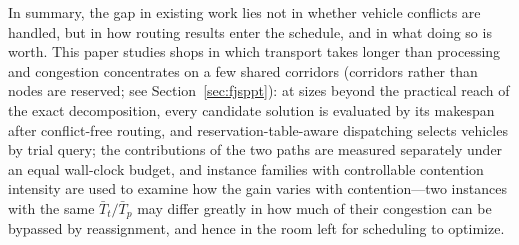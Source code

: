 In summary, the gap in existing work lies not in whether vehicle conflicts are handled, but in how routing results enter the schedule, and in what doing so is worth.
This paper studies shops in which transport takes longer than processing and congestion concentrates on a few shared corridors (corridors rather than nodes are reserved; see Section~\ref{sec:fjsppt}): at sizes beyond the practical reach of the exact decomposition, every candidate solution is evaluated by its makespan after conflict-free routing, and reservation-table-aware dispatching selects vehicles by trial query; the contributions of the two paths are measured separately under an equal wall-clock budget, and instance families with controllable contention intensity are used to examine how the gain varies with contention---two instances with the same $\bar{T}_t/\bar{T}_p$ may differ greatly in how much of their congestion can be bypassed by reassignment, and hence in the room left for scheduling to optimize.

